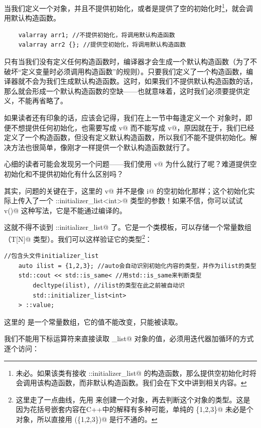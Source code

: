 当我们定义一个对象，并且不提供初始化，或者是提供了空的初始化时\footnote{未必。如果该类有接收 \lstinline@std::initializer_list@ 的构造函数，那么提供空初始化时将会调用该构造函数，而非默认构造函数。我们会在下文中讲到相关内容。}，就会调用默认构造函数。
\begin{lstlisting}
    valarray arr1; //不提供初始化，将调用默认构造函数
    valarray arr2 {}; //提供空初始化，将调用默认构造函数
\end{lstlisting}\par
只有当我们没有定义任何构造函数时，编译器才会生成一个默认构造函数（为了不破坏``定义变量时必须调用构造函数''的规则）。只要我们定义了一个构造函数，编译器就不会为我们生成默认构造函数。这时，如果我们不提供默认构造函数的话，那么就会形成一个默认构造函数的空缺——也就意味着，这时我们必须要提供定义，不能再省略了。\par
如果读者还有印象的话，应该会记得，我们在上一节中每逢定义一个 \lstinline@valarri@ 对象时，即便不想提供任何初始化，也需要写成 \lstinline@valarri v{}@ 而不能写成 \lstinline@valarri v@，原因就在于，我们已经定义了一个构造函数，但没有定义默认构造函数，所以我们不能不提供初始化。解决方法也很简单，像刚才一样提供一个默认构造函数就行了。\par
心细的读者可能会发现另一个问题——我们使用 \lstinline@valarri v{}@ 为什么就行了呢？难道提供空初始化和不提供初始化有什么区别吗？\par
其实，问题的关键在于，这里的 \lstinline@valarri v{}@ 并不是像 \lstinline@int i{}@ 的空初始化那样；这个初始化实际上传入了一个 \lstinline@std::initializer_list<int>@ 类型的参数！如果不信，你可以试试 \lstinline@valarri v()@ 这种写法，它是不能通过编译的。\par
这就不得不谈到 \lstinline@std::initializer_list@ 了。它是一个类模板，可以存储一个常量数组（\lstinline@const T[N]@ 类型）。我们可以这样验证它的类型\footnote{这里走了一点曲线，先用 \lstinline@auto@ 来创建一个对象，再去判断这个对象的类型。这是因为花括号嵌套内容在C++中的解释有多种可能，单纯的 \lstinline@\{1,2,3\}@ 未必是个对象，所以直接用 \lstinline@decltype(\{1,2,3\})@ 是行不通的。}：
\begin{lstlisting}
//包含头文件initializer_list
    auto ilist = {1,2,3}; //auto会自动识别初始化内容的类型，并作为ilist的类型
    std::cout << std::is_same< //用std::is_same来判断类型
        decltype(ilist), //ilist的类型在此之前被自动识
        std::initializer_list<int>
    > ::value;
\end{lstlisting}
这里的 \lstinline@ilist@ 是一个常量数组，它的值不能改变，只能被读取。\par
我们不能用下标运算符来直接读取 \lstinline@initializer_list@ 对象的值，必须用迭代器加循环的方式逐个访问：
